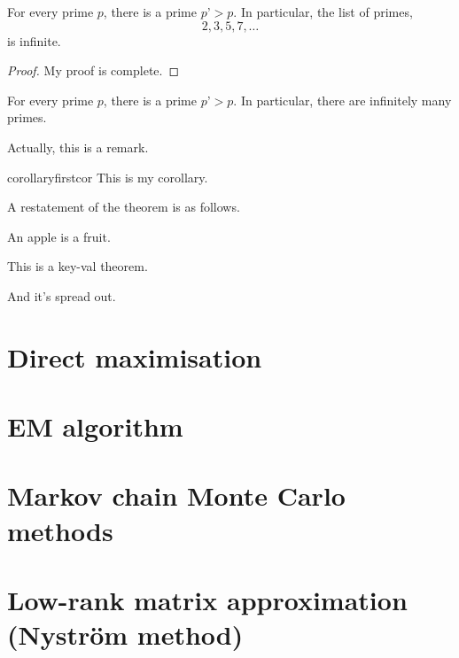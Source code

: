 \documentclass[a4paper,showframe,11pt,draft]{report}
\begin{document}

\lipsum[1]

\begin{theorem}[Euclid] \label{thm:euclid}%
For every prime $p$, there is a prime $p’>p$.
In particular, the list of primes,
\begin{equation}\label{eq:1}
  2,3,5,7,\dots
\end{equation}
is infinite.
\end{theorem}

\begin{proof}
My proof is complete.
\end{proof}

\lipsum[2]

\begin{lemma}[Something]
  For every prime $p$, there is a prime $p’>p$.
  In particular, there are infinitely many primes.
\end{lemma}

\begin{remark}
Actually, this is a remark.  
\end{remark}

\lipsum[3]

\begin{restatable}[Anything]{corollary}{firstcor} 
This is my corollary.
\end{restatable}

\lipsum[4]

A restatement of the theorem is as follows.

\firstcor*

\begin{definition}[Apple]
An apple is a fruit.
\end{definition}

\lipsum[5]

\begin{theorem}[name=Keyed theorem,
  label=thm:key]
  This is a
  key-val theorem.
\end{theorem}

\begin{theorem}[continues=thm:key]
  And it’s spread out.
\end{theorem}

\section{Direct maximisation}

\section{EM algorithm}


\section{Markov chain Monte Carlo methods}

\section{Low-rank matrix approximation (Nystr\"om method)}

\hClosingStuffStandalone
\end{document}
